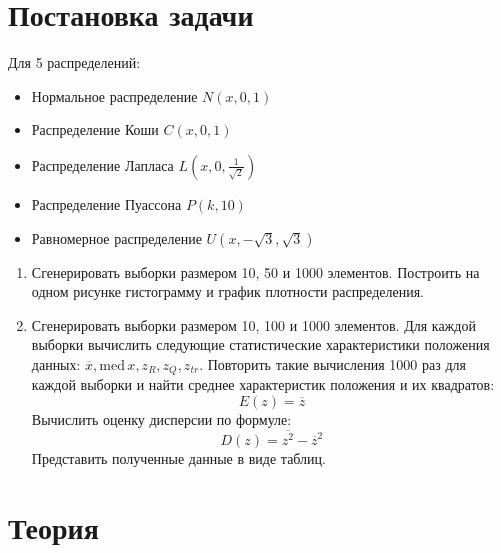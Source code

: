 \documentclass[a4paper,12pt]{article} %
\begin{document}
\section{Постановка задачи}
Для 5 распределений:
\begin{itemize}
    \item Нормальное распределение $N(x, 0, 1)$
    \item Распределение Коши $C(x, 0, 1)$
    \item Распределение Лапласа $L(x, 0, \frac{1}{\sqrt{2}})$
    \item Распределение Пуассона $P(k, 10)$
    \item Равномерное распределение $U(x,-\sqrt{3},\sqrt{3})$
\end{itemize}
\begin{enumerate}
    \item Сгенерировать выборки размером 10, 50 и 1000 элементов. Построить на одном рисунке гистограмму и график плотности распределения.
    \item Сгенерировать выборки размером 10, 100 и 1000 элементов.
    Для каждой выборки вычислить следующие статистические характеристики положения данных: $\overline{x}, \mathrm{med}\,x, z_R, z_Q, z_{tr}$. Повторить такие вычисления 1000 раз для каждой выборки и найти среднее характеристик положения и их квадратов:
    \begin{equation}\label{mean_formula}
        E(z)=\overline{z}
    \end{equation}
    Вычислить оценку дисперсии по формуле:
    \begin{equation}\label{variance_formula}
        D(z)=\overline{z^2}-\overline{z}^2
    \end{equation}
    Представить полученные данные в виде таблиц.
\end{enumerate}
\section{Теория}
\end{document}

